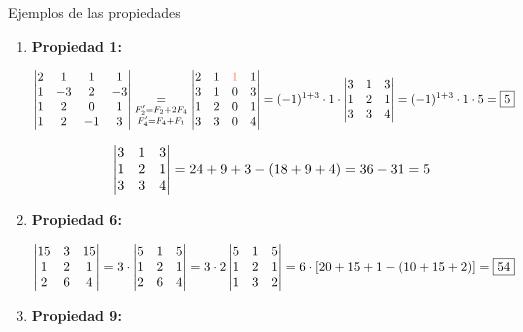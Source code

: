\documentclass[11pt,a4paper]{article}
\newcommand{\fmdisp}[1]{\[\setbox2=\hbox{$\displaystyle #1$}\ifdim\wd2>\linewidth\resizebox{\linewidth}{!}{\box2}\else\box2\fi\]}
\begin{document}
\begin{fmex}{Ejemplos de las propiedades}
\begin{enumerate}[label=\textbf{\arabic*.},leftmargin=*]
\item \textbf{Propiedad 1:}

\fmdisp{\begin{vmatrix}2 & 1 & 1 & 1\\ 1 & -3 & 2 & -3\\ 1 & 2 & 0 & 1\\ 1 & 2 & -1 & 3\end{vmatrix}\underset{\substack{F_2'=F_2+2F_4\\ F_4'=F_4+F_1}}{=}\begin{vmatrix}2 & 1 & \color[HTML]{ff7a50}1 & 1\\ 3 & 1 & 0 & 3\\ 1 & 2 & 0 & 1\\ 3 & 3 & 0 & 4\end{vmatrix}=(-1)^{1+3}\cdot1\cdot\begin{vmatrix}3 & 1 & 3\\ 1 & 2 & 1\\ 3 & 3 & 4\end{vmatrix}=(-1)^{1+3}\cdot1\cdot5=\boxed{5}}

\fmdisp{\begin{vmatrix}3 & 1 & 3\\ 1 & 2 & 1\\ 3 & 3 & 4\end{vmatrix}=24+9+3-(18+9+4)=36-31=5}

\item \textbf{Propiedad 6:}

\fmdisp{\begin{vmatrix}15 & 3 & 15\\ 1 & 2 & 1\\ 2 & 6 & 4\end{vmatrix}=3\cdot\begin{vmatrix}5 & 1 & 5\\ 1 & 2 & 1\\ 2 & 6 & 4\end{vmatrix}=3\cdot2\begin{vmatrix}5 & 1 & 5\\ 1 & 2 & 1\\ 1 & 3 & 2\end{vmatrix}=6\cdot[20+15+1-(10+15+2)]=\boxed{54}}

\item \textbf{Propiedad 9:}


\end{enumerate}
\end{fmex}
\end{document}
